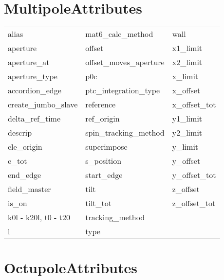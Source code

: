  \section{MultipoleAttributes}
 \label{s:list.multipole}
 
 \begin{tabular}{lll} \toprule
alias                       & mat6_calc_method            & wall                        \\
aperture                    & offset                      & x1_limit                    \\
aperture_at                 & offset_moves_aperture       & x2_limit                    \\
aperture_type               & p0c                         & x_limit                     \\
accordion_edge              & ptc_integration_type        & x_offset                    \\
create_jumbo_slave          & reference                   & x_offset_tot                \\
delta_ref_time              & ref_origin                  & y1_limit                    \\
descrip                     & spin_tracking_method        & y2_limit                    \\
ele_origin                  & superimpose                 & y_limit                     \\
e_tot                       & s_position                  & y_offset                    \\
end_edge                    & start_edge                  & y_offset_tot                \\
field_master                & tilt                        & z_offset                    \\
is_on                       & tilt_tot                    & z_offset_tot                \\
k0l - k20l, t0 - t20        & tracking_method             &                             \\
l                           & type                        &                             \\
 \bottomrule
 \end{tabular}
 \vfill
 
 \section{OctupoleAttributes}
 \label{s:list.octupole}
 
